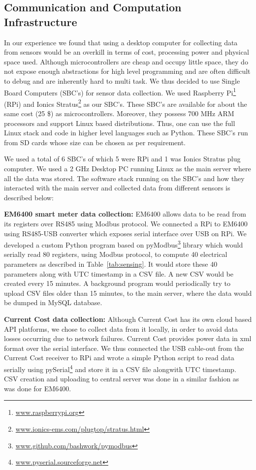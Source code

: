 \documentclass[10pt]{sensys-proc}
\newcommand{\tabref}[1]{Table~\ref{#1}}
\begin{document}
\subsection{Communication and Computation Infrastructure}
In our experience we found that using a desktop computer for collecting data from sensors would be an overkill in terms of cost, processing power and physical space used. Although microcontrollers are cheap and occupy little space, they do not expose enough abstractions for high level programming and are often difficult to debug and are inherently hard to multi task. We thus decided to use Single Board Computers (SBC's) for sensor data collection. We used Raspberry Pi\footnote{\url{www.raspberrypi.org}} (RPi) and Ionics Stratus\footnote{\url{www.ionics-ems.com/plugtop/stratus.html}} as our SBC's. These SBC's are available for about the same cost (25 \$) as microcontrollers. Moreover, they possess 700 MHz ARM processors and support Linux based distributions. Thus, one can use the full Linux stack and code in higher level languages such as Python. These SBC's run from SD cards whose size can be chosen as per requirement. 

We used a total of 6 SBC's of which 5 were RPi and 1 was Ionics Stratus plug computer. We used a 2 GHz Desktop PC running Linux as the main server where all the data was stored. The software stack running on the SBC's and how they interacted with the main server and collected data from different sensors is described below:

\noindent \textbf{EM6400 smart meter data collection:} EM6400 allows data to be read from its registers over RS485 using Modbus protocol. We connected a RPi to EM6400 using RS485-USB converter which exposes serial interface over USB on RPi. We developed a custom Python program based on pyModbus\footnote{\url{www.github.com/bashwork/pymodbus}} library which would serially read 80 registers, using Modbus protocol, to compute 40 electrical parameters as described in \tabref{tab:sensing}. It would store these 40 parameters along with UTC timestamp in a CSV file. A new CSV would be created every 15 minutes. A background program would periodically try to upload CSV files older than 15 minutes, to the main server, where the data would be dumped in MySQL database.

\noindent \textbf{Current Cost data collection:} Although Current Cost has its own cloud based API platforms, we chose to collect data from it locally, in order to avoid data losses occurring due to network failures. Current Cost provides power data in xml format over the serial interface. We thus connected the USB cable-out from the Current Cost receiver to RPi and wrote a simple Python script to read data serially using pySerial\footnote{\url{www.pyserial.sourceforge.net}} and store it in a CSV file alongwith UTC timestamp. CSV creation and uploading to central server was done in a similar fashion as was done for EM6400.
\end{document}
